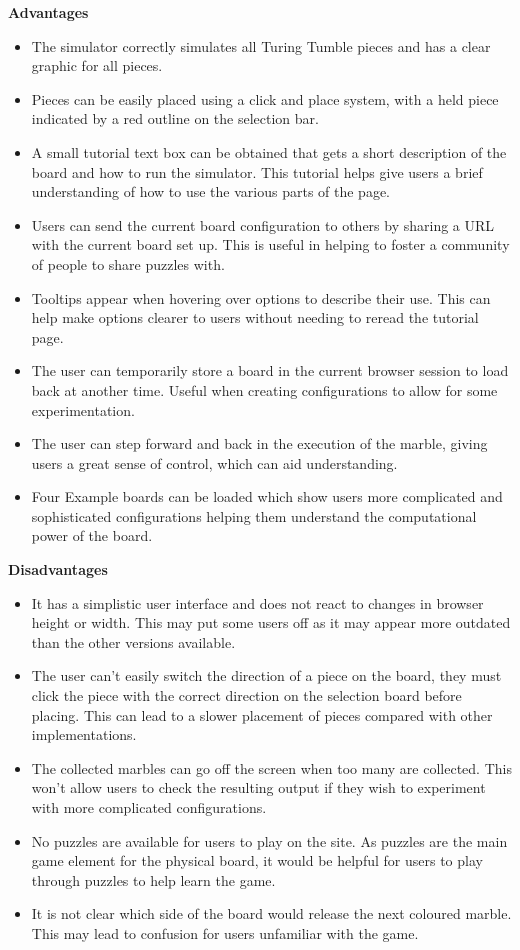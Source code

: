 \documentclass{l4proj}
\begin{document}
\textbf{Advantages}
\begin{itemize}
    \item The simulator correctly simulates all Turing Tumble pieces and has a clear graphic for all pieces.
    \item Pieces can be easily placed using a click and place system, with a held piece indicated by a red outline on the selection bar.
    \item A small tutorial text box can be obtained that gets a short description of the board and how to run the simulator. This tutorial helps give users a brief understanding of how to use the various parts of the page.
    \item Users can send the current board configuration to others by sharing a URL with the current board set up. This is useful in helping to foster a community of people to share puzzles with.
    \item Tooltips appear when hovering over options to describe their use. This can help make options clearer to users without needing to reread the tutorial page.
    \item The user can temporarily store a board in the current browser session to load back at another time. Useful when creating configurations to allow for some experimentation.
    \item The user can step forward and back in the execution of the marble, giving users a great sense of control, which can aid understanding.
    \item Four Example boards can be loaded which show users more complicated and sophisticated configurations helping them understand the computational power of the board.
\end{itemize}

\textbf{Disadvantages}
\begin{itemize}
    \item It has a simplistic user interface and does not react to changes in browser height or width. This may put some users off as it may appear more outdated than the other versions available.
    \item The user can't easily switch the direction of a piece on the board, they must click the piece with the correct direction on the selection board before placing. This can lead to a slower placement of pieces compared with other implementations.
    \item The collected marbles can go off the screen when too many are collected. This won't allow users to check the resulting output if they wish to experiment with more complicated configurations.
    \item No puzzles are available for users to play on the site. As puzzles are the main game element for the physical board, it would be helpful for users to play through puzzles to help learn the game.
    \item It is not clear which side of the board would release the next coloured marble. This may lead to confusion for users unfamiliar with the game.
\end{itemize}
\end{document}
